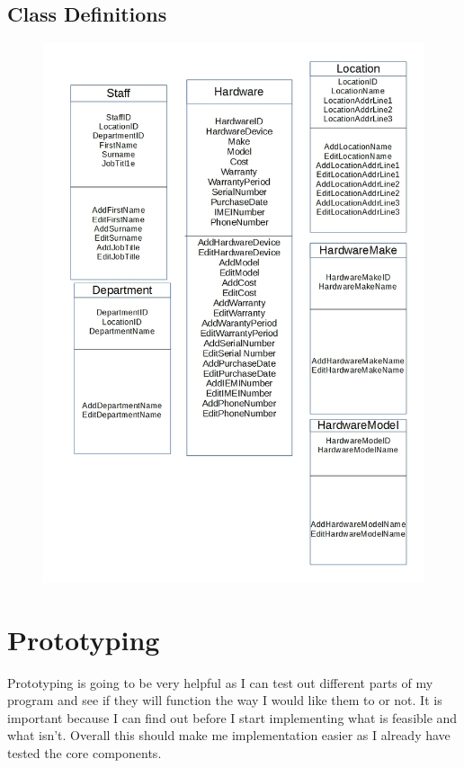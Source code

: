 \subsection{Class Definitions}

\begin{figure}[H]
\hspace*{-1.3cm}
\vspace*{-1cm}
\includegraphics[width=1\textwidth]{ClassDefinitonsDesign.jpg}
\caption{} \label{Class Definitions}
\end{figure}

\section{Prototyping}

Prototyping is going to be very helpful as I can test out different parts of my program and see if they will function the way I would like them to or not. It is important because I can find out before I start implementing what is feasible and what isn't. Overall this should make me implementation easier as I already have tested the core components. 

